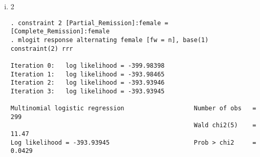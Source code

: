 \documentclass{article}
\begin{document}
\begin{enumerate}[a.]
\begin{enumerate}[i.]
\begin{verbatim}
( 1)  [Partial_Remission]alternating - [Complete_Remission]alternating = 0
-------------------------------------------------------------------------------------
           response |        RRR   Std. Err.      z    P>|z|     [95% Conf. Interval]
--------------------+----------------------------------------------------------------
Progressive_Disease |  (base outcome)
--------------------+----------------------------------------------------------------
No_Change           |
        alternating |   .5398146   .1594993    -2.09   0.037       .30251    .9632734
             female |   .9129831   .3456741    -0.24   0.810     .4346908    1.917543
              _cons |   1.811757   .4205349     2.56   0.010     1.149539     2.85546
--------------------+----------------------------------------------------------------
Partial_Remission   |
        alternating |   .4264608   .1277961    -2.84   0.004     .2370294    .7672837
             female |    .695995   .3317346    -0.76   0.447     .2734607    1.771403
              _cons |   1.107906   .2756531     0.41   0.680     .6803292    1.804207
--------------------+----------------------------------------------------------------
Complete_Remission  |
        alternating |   .4264608   .1277961    -2.84   0.004     .2370294    .7672837
             female |   .2780198   .1837548    -1.94   0.053     .0761169    1.015477
              _cons |   1.040075   .2615435     0.16   0.876     .6353547    1.702601
-------------------------------------------------------------------------------------

. lrtest part1a

Likelihood-ratio test                                 LR chi2(1)  =      0.06
(Assumption: . nested in part1a)                      Prob > chi2 =    0.8021

\end{verbatim}
	
	In this case we say
	
	\item 2
	
\begin{verbatim}
. constraint 2 [Partial_Remission]:female = [Complete_Remission]:female
. mlogit response alternating female [fw = n], base(1) constraint(2) rrr

Iteration 0:   log likelihood = -399.98398  
Iteration 1:   log likelihood = -393.98465  
Iteration 2:   log likelihood = -393.93946  
Iteration 3:   log likelihood = -393.93945  

Multinomial logistic regression                   Number of obs   =        299
                                                  Wald chi2(5)    =      11.47
Log likelihood = -393.93945                       Prob > chi2     =     0.0429


\end{verbatim}
\end{enumerate}
\end{enumerate}
\end{document}
